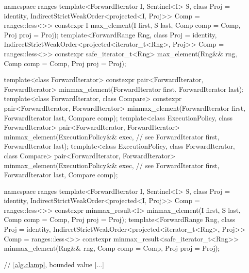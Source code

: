 \begin{addedblock}
\begin{codeblock}
  namespace ranges {
    template<ForwardIterator I, Sentinel<I> S, class Proj = identity,
        IndirectStrictWeakOrder<projected<I, Proj>> Comp = ranges::less<>>
      constexpr I max_element(I first, S last, Comp comp = Comp{}, Proj proj = Proj{});
    template<ForwardRange Rng, class Proj = identity,
        IndirectStrictWeakOrder<projected<iterator_t<Rng>, Proj>> Comp = ranges::less<>>
      constexpr safe_iterator_t<Rng>
        max_element(Rng&& rng, Comp comp = Comp{}, Proj proj = Proj{});
  }
\end{codeblock}\end{addedblock}\begin{codeblock}
  template<class ForwardIterator>
    constexpr pair<ForwardIterator, ForwardIterator>
      minmax_element(ForwardIterator first, ForwardIterator last);
  template<class ForwardIterator, class Compare>
    constexpr pair<ForwardIterator, ForwardIterator>
      minmax_element(ForwardIterator first, ForwardIterator last, Compare comp);
  template<class ExecutionPolicy, class ForwardIterator>
    pair<ForwardIterator, ForwardIterator>
      minmax_element(ExecutionPolicy&& exec, // see 
                     ForwardIterator first, ForwardIterator last);
  template<class ExecutionPolicy, class ForwardIterator, class Compare>
    pair<ForwardIterator, ForwardIterator>
      minmax_element(ExecutionPolicy&& exec, // see 
                     ForwardIterator first, ForwardIterator last, Compare comp);
\end{codeblock}\begin{addedblock}\begin{codeblock}
  namespace ranges {
    template<ForwardIterator I, Sentinel<I> S, class Proj = identity,
        IndirectStrictWeakOrder<projected<I, Proj>> Comp = ranges::less<>>
      constexpr minmax_result<I>
        minmax_element(I first, S last, Comp comp = Comp{}, Proj proj = Proj{});
    template<ForwardRange Rng, class Proj = identity,
        IndirectStrictWeakOrder<projected<iterator_t<Rng>, Proj>> Comp = ranges::less<>>
      constexpr minmax_result<safe_iterator_t<Rng>>
        minmax_element(Rng&& rng, Comp comp = Comp{}, Proj proj = Proj{});
  }
\end{codeblock}\end{addedblock}\begin{codeblock}

  // \ref{alg.clamp}, bounded value
  [...]


\end{codeblock}
